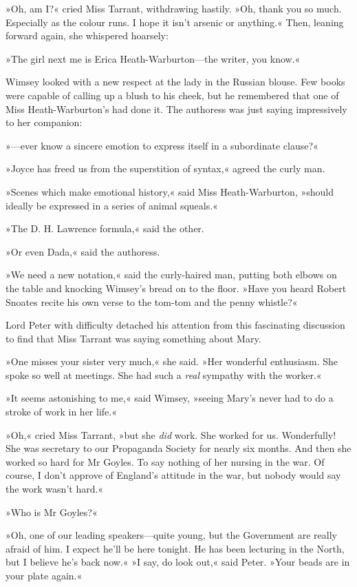 »Oh, am I?« cried Miss Tarrant, withdrawing hastily. »Oh, thank you so much. Especially as the colour runs. I hope it isn't arsenic or anything.« Then, leaning forward again, she whispered hoarsely:

»The girl next me is Erica Heath-Warburton\allowbreak---\allowbreak the writer, you know.«

Wimsey looked with a new respect at the lady in the Russian blouse.  Few books were capable of calling up a blush to his cheek, but he remembered that one of Miss Heath-Warburton's had done it. The authoress was just saying impressively to her companion:

»---ever know a sincere emotion to express itself in a subordinate clause?«

»Joyce has freed us from the superstition of syntax,« agreed the curly man.

»Scenes which make emotional history,« said Miss Heath-Warburton, »should ideally be expressed in a series of animal squeals.«

»The D. H. Lawrence formula,« said the other.

»Or even Dada,« said the authoress.

»We need a new notation,« said the curly-haired man, putting both elbows on the table and knocking Wimsey's bread on to the floor. »Have you heard Robert Snoates recite his own verse to the tom-tom and the penny whistle?«

Lord Peter with difficulty detached his attention from this fascinating discussion to find that Miss Tarrant was saying something about Mary.

»One misses your sister very much,« she said. »Her wonderful enthusiasm. She spoke so well at meetings. She had such a \textit{real} sympathy with the worker.«

»It seems astonishing to me,« said Wimsey, »seeing Mary's never had to do a stroke of work in her life.«

»Oh,« cried Miss Tarrant, »but she \textit{did} work. She worked for us.  Wonderfully! She was secretary to our Propaganda Society for nearly six months. And then she worked so hard for Mr Goyles. To say nothing of her nursing in the war. Of course, I don't approve of England's attitude in the war, but nobody would say the work wasn't hard.«

»Who is Mr Goyles?«

»Oh, one of our leading speakers\allowbreak---\allowbreak quite young, but the Government are really afraid of him. I expect he'll be here tonight. He has been lecturing in the North, but I believe he's back now.«
»I say, do look out,« said Peter. »Your beads are in your plate again.«

